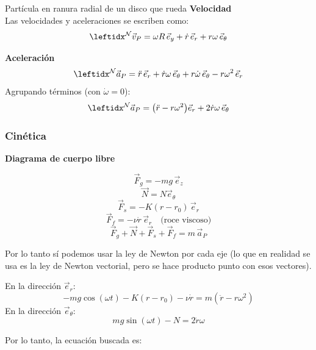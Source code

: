 \begin{solucion}{Partícula en ranura radial de un disco que rueda}
\textbf{Velocidad}\\
Las velocidades y aceleraciones se escriben como:
$$ \marc{\vec{v}_P}{N} = \omega R\, \vec{e}_y + \dot{r}\,\vec{e}_r + r\omega\, \vec{e}_\theta $$


\textbf{Aceleración}\\
$$ \marc{\vec{a}_P}{N} = \ddot{r}\,\vec{e}_r + \dot{r}\omega\, \vec{e}_\theta + r\dot{\omega}\,\vec{e}_\theta - r\omega^2\, \vec{e}_r $$
Agrupando términos (con $\dot\omega=0$):
$$ \marc{\vec{a}_P}{N} = \big(\ddot{r} - r\omega^2\big)\vec{e}_r + 2\dot{r}\omega\, \vec{e}_\theta $$

\subsubsection*{Cinética}
\textbf{Diagrama de cuerpo libre}
\begin{center}
\end{center}
$$ \vec{F}_g = -mg\,\vec{e}_z $$
$$ \vec{N} = N \vec{e}_\theta $$
$$ \vec{F}_s = -K(r-r_0)\,\vec{e}_r $$
$$ \vec{F}_f = -\nu \dot{r}\,\vec{e}_r \quad \text{(roce viscoso)} $$
$$ \vec{F}_g + \vec{N} + \vec{F}_s + \vec{F}_f = m \, \vec{a}_P $$

Por lo tanto sí podemos usar la ley de Newton por cada eje (lo que en realidad se usa es la ley de Newton vectorial, pero se hace producto punto con esos vectores).

En la dirección $\vec{e}_r$:
$$ -mg\cos(\omega t) - K(r-r_0) - \nu \dot{r} = m\left(\ddot{r} - r\omega^2\right) $$
En la dirección $\vec{e}_\theta$:
$$ mg\sin(\omega t) - N = 2\dot{r}\omega $$

Por lo tanto, la ecuación buscada es:

\end{solucion}
